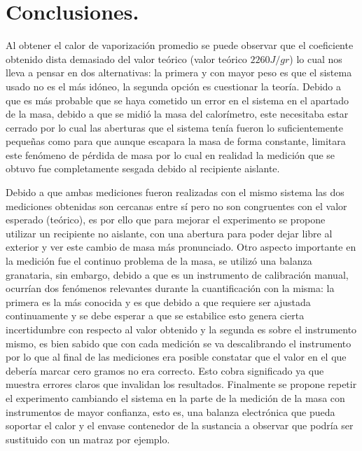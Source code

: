 \documentclass[a4paper]{article}
\begin{document}
\section*{Conclusiones.}
Al obtener el calor de vaporización promedio se puede observar que el coeficiente obtenido dista demasiado del valor teórico (valor teórico $2260 J/gr$) lo cual nos lleva a pensar en dos alternativas: la primera y con mayor peso es que el sistema usado no es el más idóneo, la segunda opción es cuestionar la teoría. Debido a que es más probable que se haya cometido un error en el sistema en el apartado de la masa, debido a que se midió la masa del calorímetro, este necesitaba estar cerrado por lo cual las aberturas que el sistema tenía fueron lo suficientemente pequeñas como para que aunque escapara la masa de forma constante, limitara este fenómeno de pérdida de masa por lo cual en realidad la medición que se obtuvo fue completamente sesgada debido al recipiente aislante.

Debido a que ambas mediciones fueron realizadas con el mismo sistema las dos mediciones obtenidas son cercanas entre sí pero no son congruentes con el valor esperado (teórico), es por ello que para mejorar el experimento se propone utilizar un recipiente no aislante, con una abertura para poder dejar libre al exterior y ver este cambio de masa más pronunciado. Otro aspecto importante en la medición fue el continuo problema de la masa, se utilizó una balanza granataria, sin embargo, debido a que es un instrumento de calibración manual, ocurrían dos fenómenos relevantes durante la cuantificación con la misma: la primera es la más conocida y es que debido a que requiere ser ajustada continuamente y se debe esperar a que se estabilice esto genera cierta incertidumbre con respecto al valor obtenido y la segunda es sobre el instrumento mismo, es bien sabido que con cada medición se va descalibrando el instrumento por lo que al final de las mediciones era posible constatar que el valor en el que debería marcar cero gramos no era correcto. Esto cobra significado ya que muestra errores claros que invalidan los resultados. Finalmente se propone repetir el experimento cambiando el sistema en la parte de la medición de la masa con instrumentos de mayor confianza, esto es, una balanza electrónica que pueda soportar el calor y el envase contenedor de la sustancia a observar que podría ser sustituido con un matraz por ejemplo.
\end{document}

